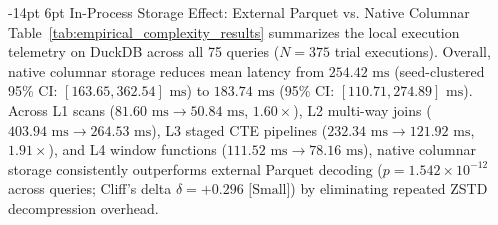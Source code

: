 \documentclass[10pt,a4paper]{article}
\makeatletter
\renewcommand\subsection{\@startsection{subsection}{2}{\z@}%
  {-14pt \@plus -3pt \@minus -1.5pt}%
  {6pt \@plus 1.5pt}%
  {\normalfont\normalsize\bfseries}}
\makeatother
\begin{document}
\subsection{In-Process Storage Effect: External Parquet vs. Native Columnar}
Table~\ref{tab:empirical_complexity_results} summarizes the local execution telemetry on DuckDB across all 75 queries ($N=375$ trial executions). Overall, native columnar storage reduces mean latency from $254.42\text{ ms}$ (seed-clustered 95\% CI: $[163.65, 362.54]\text{ ms}$) to $183.74\text{ ms}$ (95\% CI: $[110.71, 274.89]\text{ ms}$). Across L1 scans ($81.60\text{ ms} \rightarrow 50.84\text{ ms}$, $1.60\times$), L2 multi-way joins ($403.94\text{ ms} \rightarrow 264.53\text{ ms}$), L3 staged CTE pipelines ($232.34\text{ ms} \rightarrow 121.92\text{ ms}$, $1.91\times$), and L4 window functions ($111.52\text{ ms} \rightarrow 78.16\text{ ms}$), native columnar storage consistently outperforms external Parquet decoding ($p = 1.542 \times 10^{-12}$ across queries; Cliff's delta $\delta = +0.296\text{ [Small]}$) by eliminating repeated ZSTD decompression overhead.
\end{document}
